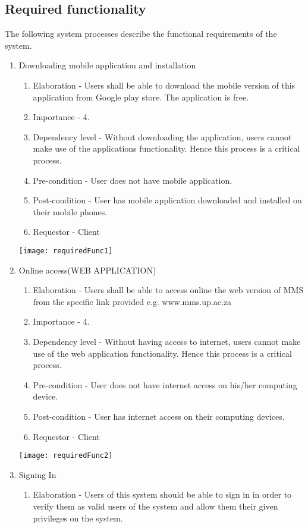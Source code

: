 \documentclass[12pt, a4paper]{scrartcl}
\begin{document}
			\subsection{Required functionality}
				The following system processes describe the functional requirements of the system.
				\begin{enumerate}
					\item Downloading mobile application and installation
					\begin{enumerate}
						\item Elaboration - Users shall be able to download the mobile version of this application from Google play store. The application is free.
						\item Importance - 4.
						\item Dependency level - Without downloading the application, users cannot make use of the applications functionality. Hence this process is a critical process.
						\item Pre-condition - User does not have mobile application.
						\item Post-condition - User has mobile application downloaded and installed on their mobile phones.
						\item Requestor - Client
					\end{enumerate}
					\texttt{[image: requiredFunc1]}
					\item Online access(WEB APPLICATION)
					\begin{enumerate}
						\item Elaboration - Users shall be able to access online the web version of MMS from the specific link provided e.g. www.mms.up.ac.za
						\item Importance - 4.
						\item Dependency level - Without having access to internet, users cannot make use of the web application functionality. Hence this process is a critical process.
						\item Pre-condition - User does not have internet access on his/her computing device.
						\item Post-condition - User has internet access on their computing devices.
						\item Requestor - Client
					\end{enumerate}
					\texttt{[image: requiredFunc2]}
					\item Signing In
					\begin{enumerate}
						\item Elaboration - Users of this system should be able to sign in in order to verify them as valid users of the system and allow them their given privileges on the system.

\end{enumerate}
\end{enumerate}
\end{document}
